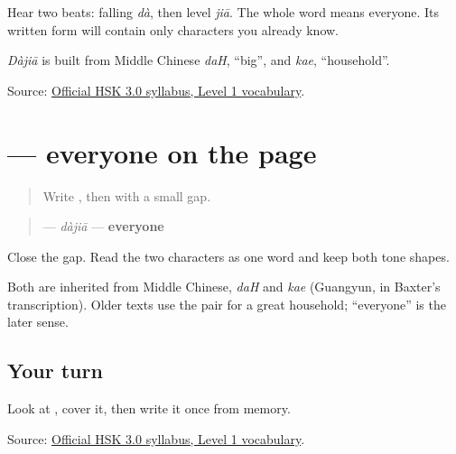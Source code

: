 Hear two beats: falling \emph{dà}, then level \emph{jiā}. The whole word means everyone. Its written form will contain only characters you already know.

\emph{Dàjiā} is built from Middle Chinese \emph{daH}, \textquotedblleft{}big\textquotedblright{}, and \emph{kae}, \textquotedblleft{}household\textquotedblright{}.

\begin{tcolorbox}[breakable,colback=teal!4,colframe=teal!35!black,title={Before you move on}]
Source: \href{https://hsk.cn-bj.ufileos.com/3.0/\%E6\%96\%B0\%E7\%89\%88HSK\%E8\%80\%83\%E8\%AF\%95\%E5\%A4\%A7\%E7\%BA\%B21219.pdf}{Official HSK 3.0 syllabus, Level 1 vocabulary}.
\end{tcolorbox}
\section[\texorpdfstring{\zh{大家} (dàjiā)}{大家 (dàjiā)}]{ — everyone on the page}

\label{lesson:ZH-C13-dajia}



\begin{quote}
Write \textbf{}, then \textbf{} with a small gap.
\end{quote}

\begin{cousinweb}
\begin{quote}
\textbf{} — \emph{dàjiā} — \textbf{everyone}
\end{quote}

Close the gap. Read the two characters as one word and keep both tone shapes.

Both are inherited from Middle Chinese, \emph{daH} and \emph{kae} (Guangyun, in Baxter's transcription). Older texts use the pair for a great household; \textquotedblleft{}everyone\textquotedblright{} is the later sense.
\end{cousinweb}

\subsection*{Your turn}
Look at \textbf{}, cover it, then write it once from memory.

\begin{tcolorbox}[breakable,colback=teal!4,colframe=teal!35!black,title={Before you move on}]
Source: \href{https://hsk.cn-bj.ufileos.com/3.0/\%E6\%96\%B0\%E7\%89\%88HSK\%E8\%80\%83\%E8\%AF\%95\%E5\%A4\%A7\%E7\%BA\%B21219.pdf}{Official HSK 3.0 syllabus, Level 1 vocabulary}.
\end{tcolorbox}

